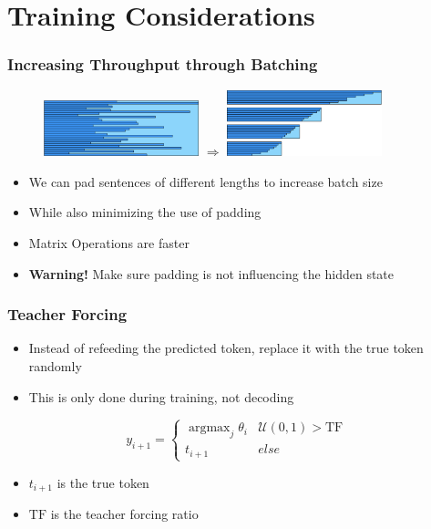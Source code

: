 \documentclass[usenames,dvipsnames]{beamer}
\DeclareMathOperator*{\argmax}{argmax}
\begin{document}
\section{Training Considerations}

\begin{frame}
\frametitle{Increasing Throughput through Batching}
\begin{figure}
  \centering
  \includegraphics[width=4.5cm, valign=c]{assets/full_batch}
  \quad
  $\Longrightarrow$
  \quad
  \includegraphics[width=4.5cm, valign=c]{assets/mini_batch}
\end{figure}
\begin{itemize}
  \item We can pad sentences of different lengths to increase batch size
  \item While also minimizing the use of padding
  \item Matrix Operations are faster
  \item \textbf{Warning!} Make sure padding is not influencing the hidden state
\end{itemize}
\end{frame}

\begin{frame}
\frametitle{Teacher Forcing}
\begin{itemize}
  \item Instead of refeeding the predicted token, replace it with the true token randomly
  \item This is only done during training, not decoding
\end{itemize}
\begin{equation*}
  y_{i+1} = \begin{cases}
    \argmax_{j} \theta_i  & \mathcal{U}(0, 1) > \text{TF} \\
    t_{i+1} & else
  \end{cases}
\end{equation*}
\begin{itemize}
  \item $t_{i+1}$ is the true token
  \item $\text{TF}$ is the teacher forcing ratio
\end{itemize}
\end{frame}
\end{document}
